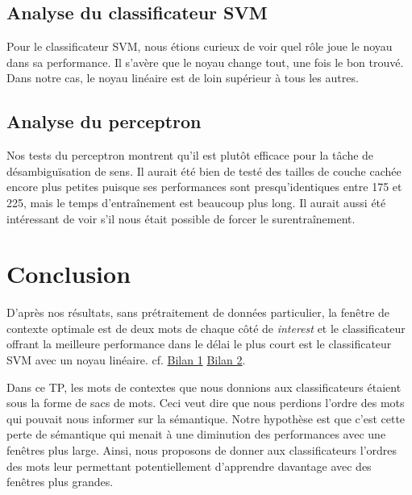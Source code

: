 \documentclass[11pt]{rapport-tp-ia}
\begin{document}
\section{Analyse du classificateur SVM}
Pour le classificateur SVM, nous étions curieux de voir quel rôle joue le noyau dans sa performance.
Il s'avère que le noyau change tout, une fois le bon trouvé.
Dans notre cas, le noyau linéaire est de loin supérieur à tous les autres.

\section{Analyse du perceptron}
Nos tests du perceptron montrent qu'il est plutôt efficace pour la tâche de désambiguïsation de sens.
Il aurait été bien de testé des tailles de couche cachée encore plus petites puisque ses performances sont presqu'identiques entre 175 et 225, mais le temps d'entraînement est beaucoup plus long.
Il aurait aussi été intéressant de voir s'il nous était possible de forcer le surentraînement.

\vspace{3em}
\newpage %
\chapter{Conclusion}
D'après nos résultats, sans prétraitement de données particulier, la fenêtre de contexte optimale est de deux mots de chaque côté de \textit{interest} et le classificateur offrant la meilleure performance dans le délai le plus court est le classificateur SVM avec un noyau linéaire. cf. \hyperref[fig:bilanwindow]{Bilan 1}
\hyperref[fig:bilanparams]{Bilan 2}.

Dans ce TP, les mots de contextes que nous donnions aux classificateurs étaient sous la forme de sacs de mots.
Ceci veut dire que nous perdions l'ordre des mots qui pouvait nous informer sur la sémantique.
Notre hypothèse est que c'est cette perte de sémantique qui menait à une diminution des performances avec une fenêtres plus large.
Ainsi, nous proposons de donner aux classificateurs l'ordres des mots leur permettant potentiellement d'apprendre davantage avec des fenêtres plus grandes.

\newpage
\end{document}
